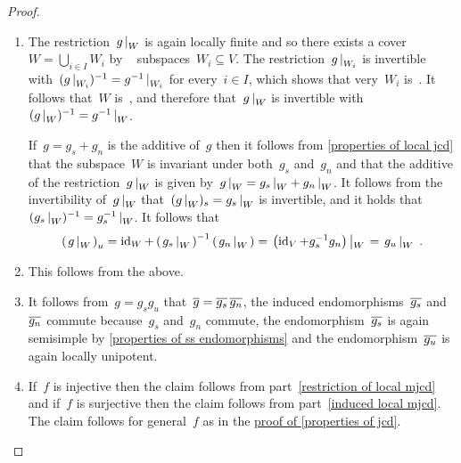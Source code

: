 \begin{proof}
  \leavevmode
  \begin{enumerate}[start=2]
    \item
      The restriction~$\restrict{g}{W}$ is again locally finite and so there exists a cover~$W = \bigcup_{i \in I} W_i$ by {\fd}~ subspaces~$W_i \subseteq V$.
      The restriction~$\restrict{g}{W_i}$ is invertible with~$(\restrict{g}{W_i})^{-1} = \restrict{g^{-1}}{W_i}$ for every~$i \in I$, which shows that very~$W_i$ is~.
      It follows that~$W$ is~, and therefore that~$\restrict{g}{W}$ is invertible with~$(\restrict{g}{W})^{-1} = \restrict{g^{-1}}{W}$.
      
      If~$g = g_s + g_n$ is the additive {\JCD} of~$g$ then it follows from \cref{properties of local jcd} that the subspace~$W$ is invariant under both~$g_s$ and~$g_n$ and that the additive {\JCD} of the restriction~$\restrict{g}{W}$ is given by~$\restrict{g}{W} = \restrict{g_s}{W} + \restrict{g_n}{W}$.
      It follows from the invertibility of~$\restrict{g}{W}$ that~$(\restrict{g}{W})_s = \restrict{g_s}{W}$ is invertible, and it holds that~$(\restrict{g_s}{W})^{-1} = \restrict{g_s^{-1}}{W}$.
      It follows that
      \[
          \left( \restrict*{g}{W} \right)_u
        =   \id_W
          + \left( \restrict*{g_s}{W} \right)^{-1}
            \left( \restrict*{g_n}{W} \right)
        = \restrict*{ \left( \id_V + g_s^{-1} g_n \right) }{W}
        = \restrict*{ g_u }{W} \,.
      \]
    \addtocounter{enumi}{-2}
    \item
      This follows from the above.
    \addtocounter{enumi}{1}
    \item
      It follows from~$g = g_s g_u$ that~$\overline{g} = \overline{g_s} \, \overline{g_n}$, the induced endomorphisms~$\overline{g_s}$ and~$\overline{g_n}$ commute because~$g_s$ and~$g_n$ commute, the endomorphism~$\overline{g_s}$ is again semisimple by \cref{properties of ss endomorphisms} and the endomorphism~$\overline{g_u}$ is again locally unipotent.
    \item
      If~$f$ is injective then the claim follows from part~\ref*{restriction of local mjcd} and if~$f$ is surjective then the claim follows from part~\ref*{induced local mjcd}.
      The claim follows for general~$f$ as in the \hyperref[properties of jcd proof]{proof of \cref{properties of jcd}}.
    \qedhere
  \end{enumerate}
\end{proof}


